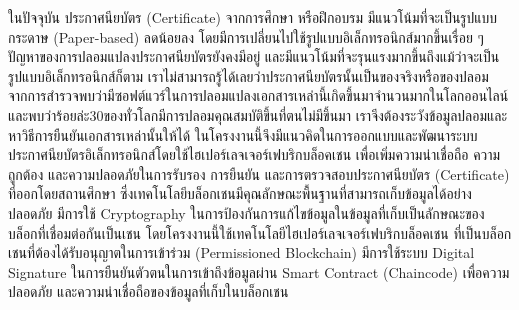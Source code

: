 \maketitle
\makesignature

\ifproject
\begin{abstractTH}
\enskip \enskip \enskip \enskip \enskip  ในปัจจุบัน ประกาศนียบัตร (Certificate) จากการศึกษา หรือฝึกอบรม มีแนวโน้มที่จะเป็นรูปแบบกระดาษ (Paper-based) ลดน้อยลง โดยมีการเปลี่ยนไปใช้รูปแบบอิเล็กทรอนิกส์มากขึ้นเรื่อย ๆ ปัญหาของการปลอมแปลงประกาศนียบัตรยังคงมีอยู่ และมีแนวโน้มที่จะรุนแรงมากขึ้นถึงแม้ว่าจะเป็นรูปแบบอิเล็กทรอนิกส์ก็ตาม เราไม่สามารถรู้ได้เลยว่าประกาศนียบัตรนั้นเป็นของจริงหรือของปลอม
จากการสำรวจพบว่ามีซอฟต์แวร์ในการปลอมแปลงเอกสารเหล่านี้เกิดขึ้นมาจำนวนมากในโลกออนไลน์
และพบว่าร้อยล่ะ30ของทั่วโลกมีการปลอมคุณสมบัติขึ้นที่ตนไม่มีขึ้นมา เราจีงต้องระวังข้อมูลปลอมและหาวิธีการยืนยันเอกสารเหล่านั้นให้ได้
 ในโครงงานนี้จึงมีแนวคิดในการออกแบบและพัฒนาระบบประกาศนียบัตรอิเล็กทรอนิกส์โดยใช้ไฮเปอร์เลจเจอร์เฟบริกบล็อคเชน เพื่อเพิ่มความน่าเชื่อถือ ความถูกต้อง และความปลอดภัยในการรับรอง การยืนยัน และการตรวจสอบประกาศนียบัตร (Certificate) ที่ออกโดยสถานศึกษา ซึ่งเทคโนโลยีบล็อกเชนมีคุณลักษณะพื้นฐานที่สามารถเก็บข้อมูลได้อย่างปลอดภัย มีการใช้ Cryptography ในการป้องกันการแก้ไขข้อมูลในข้อมูลที่เก็บเป็นลักษณะของบล็อกที่เชื่อมต่อกันเป็นเชน โดยโครงงานนี้ใช้เทคโนโลยีไฮเปอร์เลจเจอร์เฟบริกบล็อคเชน ที่เป็นบล็อกเชนที่ต้องได้รับอนุญาตในการเข้าร่วม (Permissioned Blockchain) มีการใช้ระบบ Digital Signature ในการยืนยันตัวตนในการเข้าถึงข้อมูลผ่าน Smart Contract (Chaincode) เพื่อความปลอดภัย และความน่าเชื่อถือของข้อมูลที่เก็บในบล็อกเชน 

\end{abstractTH}

